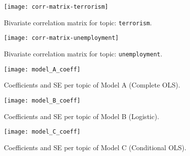 \clearpage
\begin{figure}
  \centering
  \caption{Bivariate correlation matrix for topic: \texttt{terrorism}.}\label{corr-matrix-terrorism}
  \texttt{[image: corr-matrix-terrorism]}
\end{figure}
\begin{figure}
  \centering
  \caption{Bivariate correlation matrix for topic: \texttt{unemployment}.}\label{corr-matrix-unemployment}
  \texttt{[image: corr-matrix-unemployment]}
\end{figure}

\clearpage
\thispagestyle{SectionFirstPage}
\begin{sidewaysfigure}[ht]
  \caption{Coefficients and SE per topic of Model A (Complete OLS).\label{model-a-coeff}}
  \texttt{[image: model\_A\_coeff]}
\end{sidewaysfigure}

\clearpage
\thispagestyle{SectionFirstPage}
\begin{sidewaysfigure}[ht]
  \caption{Coefficients and SE per topic of Model B (Logistic).\label{model-b-coeff}}
  \texttt{[image: model\_B\_coeff]}
\end{sidewaysfigure}

\clearpage
\thispagestyle{SectionFirstPage}
\begin{sidewaysfigure}[ht]
  \caption{Coefficients and SE per topic of Model C (Conditional OLS).\label{model-c-coeff}}
  \texttt{[image: model\_C\_coeff]}
\end{sidewaysfigure}
